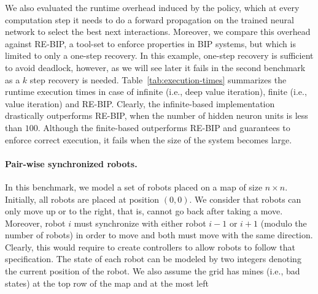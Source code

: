 We also evaluated the runtime overhead induced by the policy, which at every computation step it needs to do a forward propagation on the trained neural network to select the best next interactions. Moreover, we compare this overhead against RE-BIP, a tool-set to enforce properties in BIP systems, but which is limited to only a one-step recovery. In this example, one-step recovery is sufficient to avoid deadlock, however, as we will see later it fails in the second benchmark as a $k$ step recovery is needed. Table~\ref{tab:execution-times} summarizes the runtime execution times in case of infinite (i.e., deep value iteration), finite (i.e., value iteration) and RE-BIP. Clearly, the infinite-based implementation drastically outperforms RE-BIP, when the number of hidden neuron units is less than $100$. Although the finite-based outperforms RE-BIP and guarantees to enforce correct execution, it fails when the size of the system becomes large.  


\paragraph{Pair-wise synchronized robots.} In this benchmark, we model a set of robots placed on a map of size $n \times n$. Initially, all robots are placed at position $(0, 0)$. We consider that robots can only move up or to the right, that is, cannot go back after taking a move. Moreover, robot $i$ must synchronize with either robot $i-1$ or $i+1$ (modulo the number of robots) in order to move and both must move with the same direction. Clearly, this would require to create controllers to allow robots to follow that specification. The state of each robot can be modeled by two integers denoting the current position of the robot. We also assume the grid has mines (i.e., bad states) at the top row of the map and at the most left 

